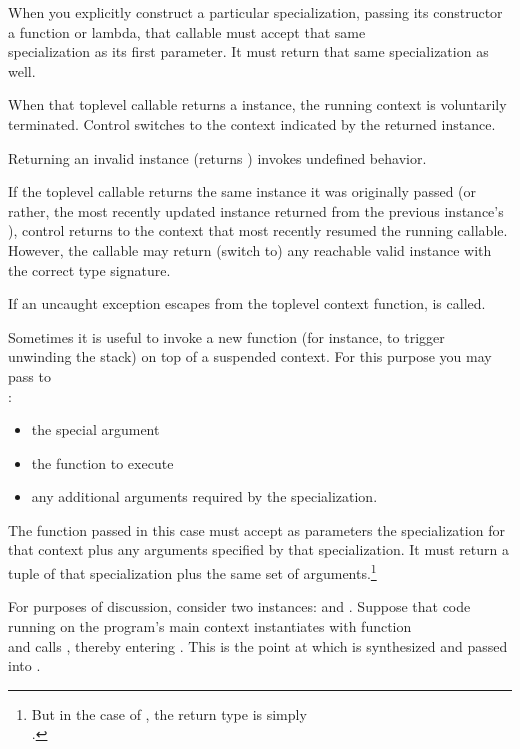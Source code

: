 When you explicitly construct a particular \ectxargs specialization, passing
its constructor a function or lambda, that callable must accept that same\\
\ectxargs specialization as its first parameter. It must return that
same \ectxargs specialization as well.

When that toplevel callable returns a \ectx instance, the running context is
voluntarily terminated. Control switches to the context indicated by the
returned \ectx instance.

Returning an invalid \ectx instance (\opbool returns ) invokes
undefined behavior.

If the toplevel callable returns the same \ectx instance it was originally
passed (or rather, the most recently updated instance returned from the
previous instance's \op), control returns to the context that most recently
resumed the running callable. However, the callable may return (switch to)
any reachable valid \ectx instance with the correct type signature.


\label{subsec:exceptions}
If an uncaught exception escapes from the toplevel context function,
 is called.


Sometimes it is useful to invoke a new function (for instance, to trigger
unwinding the stack) on top of a suspended context. For this purpose you may
pass to\\
\ectxop:

\begin{itemize}
  \item the special argument 
  \item the function to execute
  \item any additional arguments required by the \ectx specialization.
\end{itemize}

The function passed in this case must accept as parameters the \ectx
specialization for that context plus any arguments specified by that
specialization. It must return a tuple of that \ectx specialization plus the
same set of arguments.\footnote{But in the case of \ectxvoid, the return type
is simply\\\ectxvoid.}

For purposes of discussion, consider two \ectxvoid
instances:  and . Suppose that code running
on the program's main context instantiates  with function\\
\ectxvoid{} and calls , thereby
entering . This is the point at which  is synthesized
and passed into .

